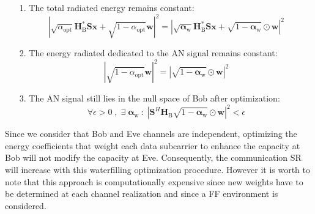\documentclass[journal,comsoc]{IEEEtran}
\newcommand{\module}[1]{\left|#1\right|}
\newcommand{\HB}{\textbf{H}_{\text{B}}}
\newcommand{\spread}{\textbf{S}}
\newcommand{\w}{\textbf{w}}
\begin{document}
\begin{itemize}
	\item[1.] The total radiated energy remains constant:
	\begin{equation}
	\module{\sqrt{\alpha_{\text{opt}}} \HB^* \spread \textbf{x} + \sqrt{1-\alpha_{\text{opt}}}  \w }^2  =   \module{\sqrt{\boldsymbol\alpha_{\text{w}}}  \HB^* \spread \textbf{x} + \sqrt{1-\boldsymbol\alpha_{\text{w}}} \odot  \w }^2
	\end{equation}
	\item[2.] The energy radiated dedicated to the AN signal remains constant:
	\begin{equation}
	\module{\sqrt{1-\alpha_{\text{opt}}}\w}^2 = \module{\sqrt{1-\boldsymbol\alpha_{\text{w}}} \odot\w}^2
	\end{equation}
	\item[3.] The AN signal still lies in the null space of Bob after optimization:
	\begin{equation}
	\forall \epsilon > 0 \; , \; \exists \;  \boldsymbol\alpha_{\text{w}} \: : \; \left|\spread^H \HB \sqrt{1-\boldsymbol\alpha_{\text{w}}}\odot \w\right|^2 < \epsilon
	\end{equation}
\end{itemize}
Since we consider that Bob and Eve channels are independent, optimizing the energy coefficients that weight each data subcarrier to enhance the capacity at Bob will not modify the capacity at Eve. Consequently, the communication SR will increase with this waterfilling optimization procedure. However it is worth to note that this approach is computationally expensive since new weights have to be determined at each channel realization and since a FF environment is considered. 
\end{document}
